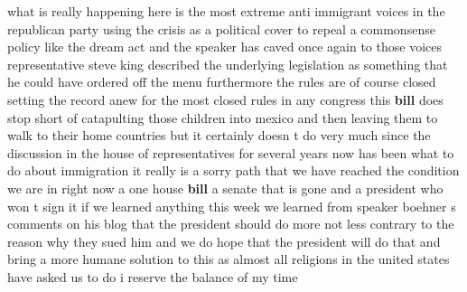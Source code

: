 \documentclass{article}
\begin{document}
\vspace{8mm}
what is really happening here is the most extreme anti immigrant voices in the republican party using the crisis as a political cover to repeal a commonsense policy like the dream act and the speaker has caved once again to those voices representative steve king described the underlying legislation as something that he could have ordered off the menu furthermore the rules are of course closed setting the record anew for the most closed rules in any congress this {\bf \color{red} bill} does stop short of catapulting those children into mexico and then leaving them to walk to their home countries but it certainly doesn t do very much since the discussion in the house of representatives for several years now has been what to do about immigration it really is a sorry path that we have reached the condition we are in right now a one house {\bf \color{red} bill} a senate that is gone and a president who won t sign it if we learned anything this week we learned from speaker boehner s comments on his blog that the president should do more not less contrary to the reason why they sued him and we do hope that the president will do that and bring a more humane solution to this as almost all religions in the united states have asked us to do i reserve the balance of my time\pagebreak
\end{document}
